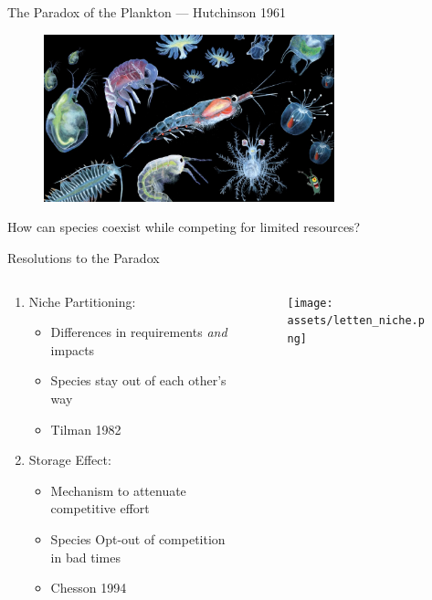 \documentclass{cubeamer}
\begin{document}
\begin{frame}{The Paradox of the Plankton --- Hutchinson 1961}
    \begin{figure}
        \includegraphics[width=0.75\textwidth]{assets/real-plankton1.jpeg}
    \end{figure}
    \begin{center}
        How can species coexist while competing for limited resources?
    \end{center}
\end{frame}

\begin{frame}{Resolutions to the Paradox}
    \begin{columns}
        \begin{column}{0.5\textwidth}
            \begin{enumerate}
                \item Niche Partitioning:
                \begin{itemize}
                    \item Differences in requirements \textit{and} impacts
                    \item Species stay out of each other's way
                    \item Tilman 1982
                \end{itemize}
                \item Storage Effect:
                \begin{itemize}
                    \item Mechanism to attenuate competitive effort
                    \item Species Opt-out of competition in bad times
                    \item Chesson 1994
                \end{itemize}
            \end{enumerate}
        \end{column}
        \begin{column}{0.5\textwidth}
            \begin{figure}
                \texttt{[image: assets/letten\_niche.png]}
            \end{figure}
        \end{column}
    \end{columns}
\end{frame}
\end{document}
